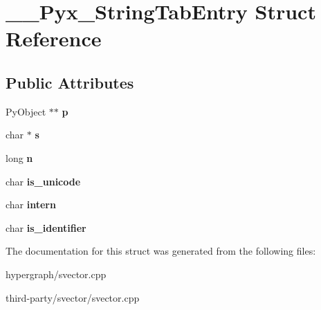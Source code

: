 \hypertarget{struct____Pyx__StringTabEntry}{
\section{\_\-\_\-Pyx\_\-StringTabEntry Struct Reference}
\label{struct____Pyx__StringTabEntry}
}
\subsection*{Public Attributes}
\begin{DoxyCompactItemize}
\item 
\hypertarget{struct____Pyx__StringTabEntry_a6ef4e6bdee8502fd357740c43c26da03}{
PyObject $\ast$$\ast$ {\bfseries p}}
\label{struct____Pyx__StringTabEntry_a6ef4e6bdee8502fd357740c43c26da03}

\item 
\hypertarget{struct____Pyx__StringTabEntry_a8d43171a59c47fad0559862692aa8a96}{
char $\ast$ {\bfseries s}}
\label{struct____Pyx__StringTabEntry_a8d43171a59c47fad0559862692aa8a96}

\item 
\hypertarget{struct____Pyx__StringTabEntry_a38ade39847ba03badabd559e78911c7f}{
long {\bfseries n}}
\label{struct____Pyx__StringTabEntry_a38ade39847ba03badabd559e78911c7f}

\item 
\hypertarget{struct____Pyx__StringTabEntry_ad3dd0dc735b64c37ab30c8c7ac5a7c9c}{
char {\bfseries is\_\-unicode}}
\label{struct____Pyx__StringTabEntry_ad3dd0dc735b64c37ab30c8c7ac5a7c9c}

\item 
\hypertarget{struct____Pyx__StringTabEntry_ae874dc013ae7e2f4dc493c96066b1cc2}{
char {\bfseries intern}}
\label{struct____Pyx__StringTabEntry_ae874dc013ae7e2f4dc493c96066b1cc2}

\item 
\hypertarget{struct____Pyx__StringTabEntry_ac4207479c5f1620aedca6d4fa885891d}{
char {\bfseries is\_\-identifier}}
\label{struct____Pyx__StringTabEntry_ac4207479c5f1620aedca6d4fa885891d}

\end{DoxyCompactItemize}


The documentation for this struct was generated from the following files:\begin{DoxyCompactItemize}
\item 
hypergraph/svector.cpp\item 
third-\/party/svector/svector.cpp\end{DoxyCompactItemize}
